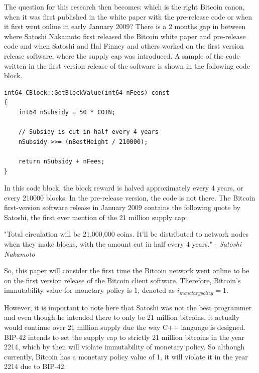 \documentclass{article}
\begin{document}
The question for this research then becomes: which is the right Bitcoin canon, when it was first published in the white paper with the pre-release code or when it first went online in early January 2009? There is a 2 months gap in between where Satoshi Nakamoto first released the Bitcoin white paper and pre-release code and when Satoshi and Hal Finney and others worked on the first version release software, where the supply cap was introduced. A sample of the code written in the first version release\cite{bitcoincode} of the software is shown in the following code block.
\begin{verbatim}
int64 CBlock::GetBlockValue(int64 nFees) const
{
    int64 nSubsidy = 50 * COIN;

    // Subsidy is cut in half every 4 years
    nSubsidy >>= (nBestHeight / 210000);

    return nSubsidy + nFees;
}
\end{verbatim}

In this code block, the block reward is halved approximately every 4 years, or every 210000 blocks. In the pre-release version, the code is not there. The Bitcoin first-version software release in January 2009 contains the following quote by Satoshi, the first ever mention of the 21 million supply cap\cite{bitcoinmailing}:

\begin{displayquote}
"Total circulation will be 21,000,000 coins. It’ll be distributed to network nodes when they make blocks, with the amount cut in half every 4 years." - \textit{Satoshi Nakamoto}
\end{displayquote}

So, this paper will consider the first time the Bitcoin network went online to be on the first version release of the Bitcoin client software. Therefore, Bitcoin’s immutability value for monetary policy is 1, denoted as $i_{monetary policy} = 1$.

However, it is important to note here that Satoshi was not the best programmer and even though he intended there to only be 21 million bitcoins, it actually would continue over 21 million supply due the way C++ language is designed. BIP-42\cite{bip42} intends to set the supply cap to strictly 21 million bitcoins in the year 2214, which by then will violate immutability of monetary policy. So although currently, Bitcoin has a monetary policy value of 1, it will violate it in the year 2214 due to BIP-42.
\end{document}
